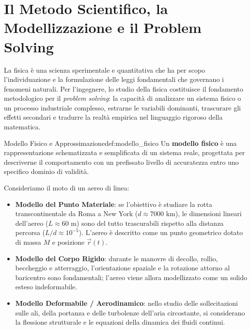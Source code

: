 \vspace{0.5em}

\section{Il Metodo Scientifico, la Modellizzazione e il Problem Solving}
\label{sec:metodo_scientifico}

La fisica è una scienza sperimentale e quantitativa che ha per scopo l'individuazione e la formulazione delle leggi fondamentali che governano i fenomeni naturali. Per l'ingegnere, lo studio della fisica costituisce il fondamento metodologico per il \emph{problem solving}: la capacità di analizzare un sistema fisico o un processo industriale complesso, estrarne le variabili dominanti, trascurare gli effetti secondari e tradurre la realtà empirica nel linguaggio rigoroso della matematica.

\begin{definizione}{Modello Fisico e Approssimazione}{def:modello_fisico}
Un \textbf{modello fisico} è una rappresentazione schematizzata e semplificata di un sistema reale, progettata per descriverne il comportamento con un prefissato livello di accuratezza entro uno specifico dominio di validità.
\end{definizione}

\begin{esempio}
Consideriamo il moto di un aereo di linea:
\begin{itemize}
    \item \textbf{Modello del Punto Materiale}: se l'obiettivo è studiare la rotta transcontinentale da Roma a New York ($d \approx 7000\text{ km}$), le dimensioni lineari dell'aereo ($L \approx 60\text{ m}$) sono del tutto trascurabili rispetto alla distanza percorsa ($L/d \approx 10^{-5}$). L'aereo è descritto come un punto geometrico dotato di massa $M$ e posizione $\vec{r}(t)$.
    \item \textbf{Modello del Corpo Rigido}: durante le manovre di decollo, rollio, beccheggio e atterraggio, l'orientazione spaziale e la rotazione attorno al baricentro sono fondamentali; l'aereo viene allora modellizzato come un solido esteso indeformabile.
    \item \textbf{Modello Deformabile / Aerodinamico}: nello studio delle sollecitazioni sulle ali, della portanza e delle turbolenze dell'aria circostante, si considerano la flessione strutturale e le equazioni della dinamica dei fluidi continui.
\end{itemize}
\end{esempio}

